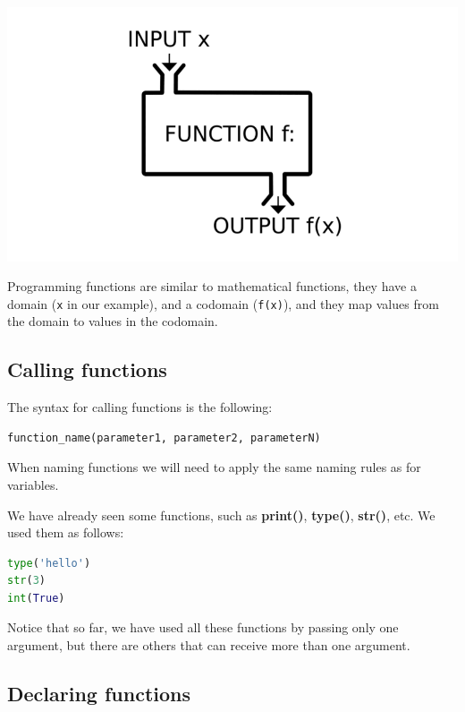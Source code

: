 \documentclass{tufte-handout}
\begin{document}
\begin{marginfigure}%
  \includegraphics[width=\linewidth]{function.png}
  \caption{Programming functions are similar to mathematical
    functions, they have a domain (\texttt{x} in our example), and a
    codomain (\texttt{f(x)}), and they map values from the domain to
    values in the codomain.}
  \label{fig:marginfig}
\end{marginfigure}

\subsection{Calling functions}\label{sec:callingfunctions}

The syntax for calling functions is the following:

\begin{lstlisting}[language=Python]
function_name(parameter1, parameter2, parameterN)
\end{lstlisting}

When naming functions we will need to apply the same naming rules as
for variables.

We have already seen some functions, such as \textbf{print()},
\textbf{type()}, \textbf{str()}, etc.  We used them as follows:

\begin{lstlisting}[language=Python]
type('hello')
str(3)
int(True)
\end{lstlisting}

Notice that so far, we have used all these functions by passing only
one argument, but there are others that can receive more than one
argument.

\subsection{Declaring functions}\label{sec:declaringfunctions}
\end{document}
